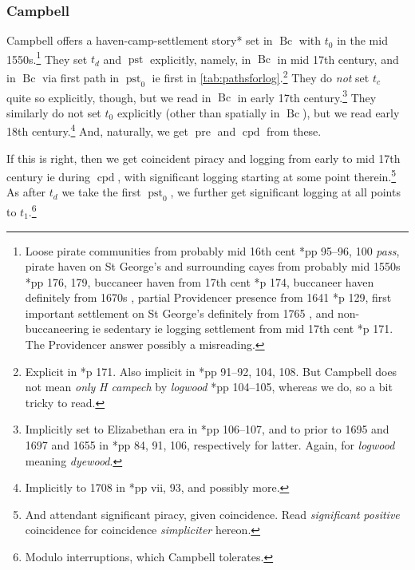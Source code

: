 \documentclass{amsart}
\newcommand{\mention}[1]{\textit{#1}}%
\newcommand{\foreign}[1]{\textit{#1}}%
\DeclareMathOperator{\bc}{Bc}%
\DeclareMathOperator{\pre}{pre}%
\DeclareMathOperator{\pst}{pst}%
\DeclareMathOperator{\cpd}{cpd}%
\theoremstyle{definition}
\theoremstyle{remark}
\begin{document}
		\subsubsection{Campbell}
		\label{sss:campbell}
		Campbell offers a haven-camp-settlement story* set in \(\bc\) with \(t_0\) in the mid 1550s.\footnote{Loose pirate communities from probably mid 16th cent \cite{cam11}*{pp 95--96, 100 \foreign{pass}}, pirate haven on St George's and surrounding cayes from probably mid 1550s \cite{cam03}*{pp 176, 179}, buccaneer haven from 17th cent \cite{cam03}*{p 174}, buccaneer haven definitely from 1670s , partial Providencer presence from 1641 \cite{cam11}*{p 129}, first important settlement on St George's definitely from 1765 , and non-buccaneering ie sedentary ie logging settlement from mid 17th cent \cite{cam03}*{p 171}. The Providencer answer possibly a misreading.} They set \(t_d\) and \(\pst\) explicitly, namely, in \(\bc\) in mid 17th century, and in \(\bc\) via first path in \(\pst_0\) ie first in \ref{tab:pathsforlog}.\footnote{Explicit in \cite{cam03}*{p 171}. Also implicit in \cite{cam11}*{pp 91--92, 104, 108}. But Campbell does not mean \emph{only} \foreign{H campech} by \mention{logwood} \cite{cam11}*{pp 104--105}, whereas we do, so a bit tricky to read.}%
		They do \emph{not} set \(t_c\) quite so explicitly, though, but we read in \(\bc\) in early 17th century.\footnote{Implicitly set to Elizabethan era in \cite{cam11}*{pp 106--107}, and to prior to 1695 and 1697 and 1655 in \cite{cam11}*{pp 84, 91, 106}, respectively for latter. Again, for \mention{logwood} meaning \mention{dyewood}.} They similarly do not set \(t_0\) explicitly (other than spatially in \(\bc\)), but we read early 18th century.\footnote{Implicitly to 1708 in \cite{cam11}*{pp vii, 93}, and possibly more.} And, naturally, we get \(\pre\) and \(\cpd\) from these.
		
		If this is right, then we get coincident piracy and logging from early to mid 17th century ie during \(\cpd\), with significant logging starting at some point therein.\footnote{And attendant significant piracy, given coincidence. Read \emph{significant} \emph{positive} coincidence for coincidence \foreign{simpliciter} hereon.} As after \(t_d\) we take the first \(\pst_0\), we further get significant logging at all points to \(t_1\).\footnote{Modulo interruptions, which Campbell tolerates.}
\end{document}
